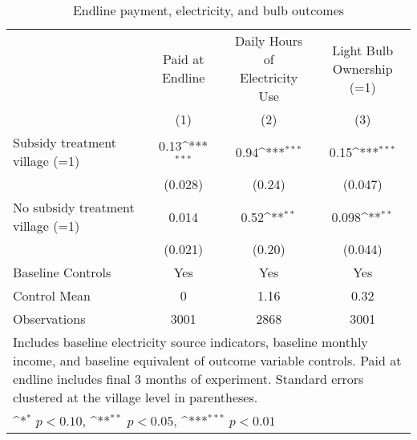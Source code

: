 \begin{table}[htbp]\centering
\def\sym#1{\ifmmode^{#1}\else\(^{#1}\)\fi}
\caption{Endline payment, electricity, and bulb outcomes}

\begin{tabular}{l*{3}{c}}
\toprule
&\shortstack{Paid at\\Endline} & \shortstack{Daily Hours of\\Electricity Use} & \shortstack{Light Bulb\\Ownership (=1)} \\
& (1) & (2) & (3) \\ \hline
Subsidy treatment village (=1)&     0.13\sym{***}&     0.94\sym{***}&     0.15\sym{***}\\
                &  (0.028)         &   (0.24)         &  (0.047)         \\
No subsidy treatment village (=1)&    0.014         &     0.52\sym{**} &    0.098\sym{**} \\
                &  (0.021)         &   (0.20)         &  (0.044)         \\
Baseline Controls &      Yes         &      Yes         &      Yes         \\
\midrule
Control Mean           &        0         &     1.16         &     0.32         \\
Observations    &     3001         &     2868         &     3001         \\
\bottomrule
\multicolumn{4}{p{\textwidth}}{\footnotesize Includes baseline electricity source indicators, baseline monthly income, and baseline equivalent of outcome variable controls. Paid at endline includes final 3 months of experiment. Standard errors clustered at the village level in parentheses.}\\
\multicolumn{4}{p{\textwidth}}{\footnotesize \sym{*} \(p<0.10\), \sym{**} \(p<0.05\), \sym{***} \(p<0.01\)}\\
\end{tabular}
\end{table}